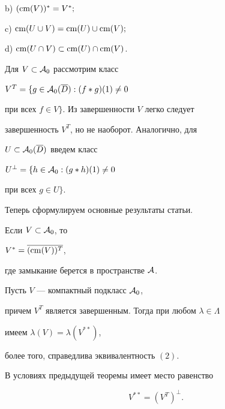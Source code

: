 b) $( \operatorname{cm} (V))^* =V^*;$





c) $\operatorname{cm} (U \cup V)= \operatorname{cm} (U) \cup \operatorname{cm} (V);$





d) $\operatorname{cm} (U \cap V) \subset \operatorname{cm} (U) \cap \operatorname{cm} (V)$.





\noindent Для $V \subset {\cal A}_0$ рассмотрим класс


$V^T = \{ g \in {\cal A}_0 (\overline{D}): (f*g)(1) \neq 0$


при всех $f \in V \}$. Из завершенности $V$ легко следует


завершенность $V^T$, но не наоборот. Аналогично, для 


$U \subset {\cal A}_0 (\overline{D})$ введем класс


$U^{\perp} = \{ h \in {\cal A}_0 :(g*h)(1) \neq 0$


при всех $g \in U \}$.





Теперь сформулируем основные результаты статьи.





\begin{thm}


Если $V \subset {\cal A}_0$, то


$V^* = \overline{(\operatorname{cm}  (V))^T }$,


где замыкание берется в пространстве ${\cal A}$.


\end{thm}





\begin{thm}


Пусть $V$ --- компактный подкласс ${\cal A}_0$, 


причем $V^T$ является завершенным. Тогда при любом $\lambda \in \Lambda$ 


имеем $\lambda(V) = \lambda(V^{**})$, 


более того, справедлива эквивалентность $(2)$.


\end{thm}





\begin{thm}


В условиях предыдущей теоремы имеет место равенство


$$


V^{**} = (V^T)^{\perp}.


$$


\end{thm}





